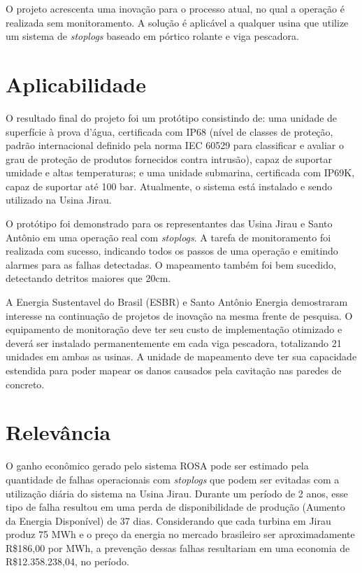 O projeto acrescenta uma inovação para o processo atual, no qual a operação é
realizada sem monitoramento. A solução é aplicável a qualquer usina que utilize
um sistema de \textit{stoplogs} baseado em pórtico rolante e viga pescadora.


\section{Aplicabilidade}

O resultado final do projeto foi um protótipo consistindo de: uma unidade de
superfície à prova d'água, certificada com IP68 (nível de classes de proteção,
padrão internacional definido pela norma IEC 60529 para classificar e avaliar
o grau de proteção de produtos fornecidos contra intrusão), capaz de suportar
umidade e altas temperaturas; e uma unidade submarina, certificada com IP69K,
capaz de suportar até 100 bar. Atualmente, o sistema está instalado e sendo
utilizado na Usina Jirau.

O protótipo foi demonstrado para os representantes das Usina Jirau e Santo
Antônio em uma operação real com \textit{stoplogs}. A tarefa de monitoramento
foi realizada com sucesso, indicando todos os passos de uma operação e emitindo
alarmes para as falhas detectadas. O mapeamento também foi bem sucedido,
detectando detritos maiores que 20cm. 

A Energia Sustentavel do Brasil (ESBR) e Santo Antônio Energia demostraram
interesse na continuação de projetos de inovação na mesma frente de pesquisa. O
equipamento de monitoração deve ter seu custo de implementação otimizado e
deverá ser instalado permanentemente em cada viga pescadora, totalizando 21
unidades em ambas as usinas. A unidade de mapeamento deve ter
sua capacidade estendida para poder mapear os danos causados pela cavitação nas
paredes de concreto.

\section{Relevância}

O ganho econômico gerado pelo sistema ROSA pode ser estimado pela quantidade de
falhas operacionais com \textit{stoplogs} que podem ser evitadas com a
utilização diária do sistema na Usina Jirau. Durante um período de 2 anos,
esse tipo de falha resultou em uma perda de disponibilidade de produção (Aumento
da Energia Disponível) de 37 dias. Considerando que cada turbina em Jirau produz
75 MWh e o preço da energia no mercado brasileiro ser aproximadamente R\$186,00
por MWh, a prevenção dessas falhas resultariam em uma economia de
R\$12.358.238,04, no período.

